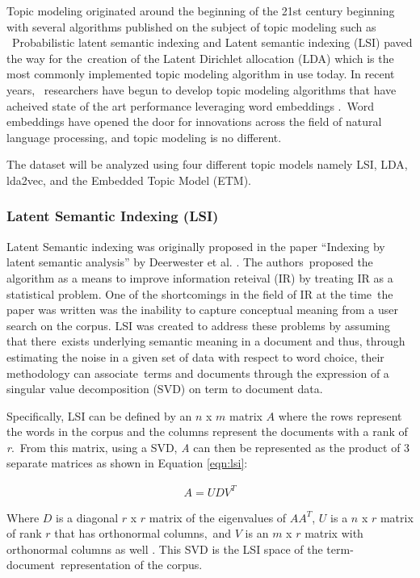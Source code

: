 \documentclass[letterpaper,12pt]{article}
\begin{document}
Topic modeling originated around the beginning of the 21st century beginning with several algorithms published on the subject of topic modeling such as \
Probabilistic latent semantic indexing \cite{hofmann1999probabilistic} and Latent semantic indexing (LSI) \cite{papadimitriou2000latent} paved the way for the\
creation of the Latent Dirichlet allocation (LDA) \cite{blei2003latent} which is the most commonly implemented topic modeling algorithm in use today. In recent years, \
researchers have begun to develop topic modeling algorithms that have acheived state of the art performance leveraging word embeddings \cite{mikolov2013distributed, dieng2019topic}.\
Word embeddings have opened the door for innovations across the field of natural language processing, and topic modeling is no different. 

The dataset will be analyzed using four different topic models namely LSI, LDA, lda2vec, and the Embedded Topic Model (ETM). 
\subsubsection{Latent Semantic Indexing (LSI)}
Latent Semantic indexing was originally proposed in the paper ``Indexing by latent semantic analysis'' by Deerwester et al. \cite{deerwester1990indexing}. The authors\
proposed the algorithm as a means to improve information reteival (IR) by treating IR as a statistical problem. One of the shortcomings in the field of IR at the time\
the paper was written was the inability to capture conceptual meaning from a user search on the corpus. LSI was created to address these problems by assuming that there\
exists underlying semantic meaning in a document and thus, through estimating the noise in a given set of data with respect to word choice, their methodology can associate\
terms and documents through the expression of a singular value decomposition (SVD) on term to document data.

Specifically, LSI can be defined by an $n$ x $m$ matrix $A$ where the rows represent the words in the corpus and the columns represent the documents with a rank of \emph{r}.\
From this matrix, using a SVD, \emph{A} can then be represented as the product of 3 separate matrices as shown in Equation \ref{eqn:lsi}:

\begin{eqnarray}
		A = UDV^T
	\label{eqn:lsi}
\end{eqnarray}

Where $D$ is a diagonal $r$ x $r$ matrix of the eigenvalues of $AA^T$, $U$ is a $n$ x $r$ matrix of rank $r$ that has orthonormal columns,\
and $V$ is an $m$ x $r$ matrix with orthonormal columns as well \cite{papadimitriou2000latent}. This SVD is the LSI space of the term-document\
representation of the corpus. 
\end{document}
